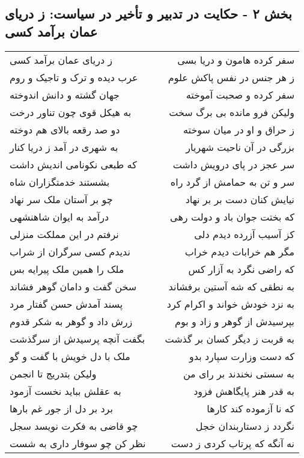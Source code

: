 \begin{center}
\section*{بخش ۲ - حکایت در تدبیر و تأخیر در سیاست: ز دریای عمان برآمد کسی}
\label{sec:002}
\begin{longtable}{l p{0.5cm} r}
ز دریای عمان برآمد کسی
&&
سفر کرده هامون و دریا بسی
\\
عرب دیده و ترک و تاجیک و روم
&&
ز هر جنس در نفس پاکش علوم
\\
جهان گشته و دانش اندوخته
&&
سفر کرده و صحبت آموخته
\\
به هیکل قوی چون تناور درخت
&&
ولیکن فرو مانده بی برگ سخت
\\
دو صد رقعه بالای هم دوخته
&&
ز حراق و او در میان سوخته
\\
به شهری در آمد ز دریا کنار
&&
بزرگی در آن ناحیت شهریار
\\
که طبعی نکونامی اندیش داشت
&&
سر عجز در پای درویش داشت
\\
بشستند خدمتگزاران شاه
&&
سر و تن به حمامش از گرد راه
\\
چو بر آستان ملک سر نهاد
&&
نیایش کنان دست بر بر نهاد
\\
درآمد به ایوان شاهنشهی
&&
که بختت جوان باد و دولت رهی
\\
نرفتم در این مملکت منزلی
&&
کز آسیب آزرده دیدم دلی
\\
ندیدم کسی سرگران از شراب
&&
مگر هم خرابات دیدم خراب
\\
ملک را همین ملک پیرایه بس
&&
که راضی نگرد به آزار کس
\\
سخن گفت و دامان گوهر فشاند
&&
به نطقی که شه آستین برفشاند
\\
پسند آمدش حسن گفتار مرد
&&
به نزد خودش خواند و اکرام کرد
\\
زرش داد و گوهر به شکر قدوم
&&
بپرسیدش از گوهر و زاد و بوم
\\
بگفت آنچه پرسیدش از سرگذشت
&&
به قربت ز دیگر کسان بر گذشت
\\
ملک با دل خویش با گفت و گو
&&
که دست وزارت سپارد بدو
\\
ولیکن بتدریج تا انجمن
&&
به سستی نخندند بر رای من
\\
به عقلش بباید نخست آزمود
&&
به قدر هنر پایگاهش فزود
\\
برد بر دل از جور غم بارها
&&
که نا آزموده کند کارها
\\
چو قاضی به فکرت نویسد سجل
&&
نگردد ز دستاربندان خجل
\\
نظر کن چو سوفار داری به شست
&&
نه آنگه که پرتاب کردی ز دست

\end{longtable}
\end{center}
